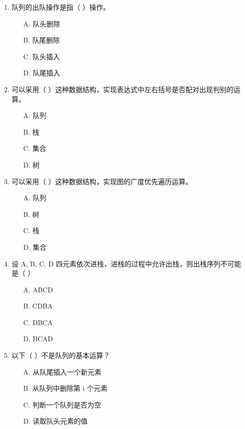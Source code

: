 \documentclass[12pt, a4paper]{article}
\begin{document}
\begin{enumerate}[label=\arabic*.]
	\item 队列的出队操作是指（ ）操作。
	      \begin{enumerate}
		      \item[A.] 队头删除
		      \item[B.] 队尾删除
		      \item[C.] 队头插入
		      \item[D.] 队尾插入
	      \end{enumerate}

	\item 可以采用（ ）这种数据结构，实现表达式中左右括号是否配对出现判别的运算。
	      \begin{enumerate}
		      \item[A.] 队列
		      \item[B.] 栈
		      \item[C.] 集合
		      \item[D.] 树
	      \end{enumerate}

	\item 可以采用（ ）这种数据结构，实现图的广度优先遍历运算。
	      \begin{enumerate}
		      \item[A.] 队列
		      \item[B.] 树
		      \item[C.] 栈
		      \item[D.] 集合
	      \end{enumerate}

	\item 设 A, B, C, D 四元素依次进栈，进栈的过程中允许出栈，则出栈序列不可能是（ ）
	      \begin{enumerate}
		      \item[A.] ABCD
		      \item[B.] CDBA
		      \item[C.] DBCA
		      \item[D.] BCAD
	      \end{enumerate}

	\item 以下（ ）不是队列的基本运算？
	      \begin{enumerate}
		      \item[A.] 从队尾插入一个新元素
		      \item[B.] 从队列中删除第 i 个元素
		      \item[C.] 判断一个队列是否为空
		      \item[D.] 读取队头元素的值
	      \end{enumerate}


\end{enumerate}
\end{document}
